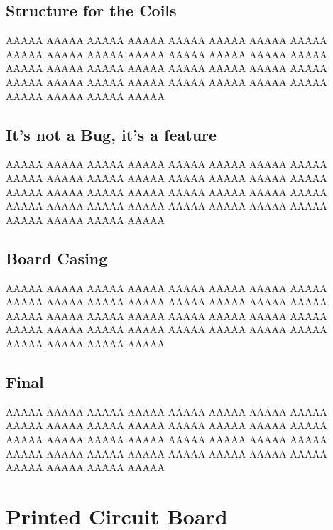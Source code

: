 \section{Structure for the Coils}

AAAAA AAAAA AAAAA AAAAA AAAAA AAAAA AAAAA AAAAA AAAAA AAAAA AAAAA AAAAA AAAAA AAAAA AAAAA AAAAA AAAAA AAAAA AAAAA AAAAA AAAAA AAAAA AAAAA AAAAA AAAAA AAAAA AAAAA AAAAA AAAAA AAAAA AAAAA AAAAA AAAAA AAAAA AAAAA AAAAA 

\section{It's not a Bug, it's a feature}

AAAAA AAAAA AAAAA AAAAA AAAAA AAAAA AAAAA AAAAA AAAAA AAAAA AAAAA AAAAA AAAAA AAAAA AAAAA AAAAA AAAAA AAAAA AAAAA AAAAA AAAAA AAAAA AAAAA AAAAA AAAAA AAAAA AAAAA AAAAA AAAAA AAAAA AAAAA AAAAA AAAAA AAAAA AAAAA AAAAA 

\section{Board Casing}

AAAAA AAAAA AAAAA AAAAA AAAAA AAAAA AAAAA AAAAA AAAAA AAAAA AAAAA AAAAA AAAAA AAAAA AAAAA AAAAA AAAAA AAAAA AAAAA AAAAA AAAAA AAAAA AAAAA AAAAA AAAAA AAAAA AAAAA AAAAA AAAAA AAAAA AAAAA AAAAA AAAAA AAAAA AAAAA AAAAA 

\section{Final}

AAAAA AAAAA AAAAA AAAAA AAAAA AAAAA AAAAA AAAAA AAAAA AAAAA AAAAA AAAAA AAAAA AAAAA AAAAA AAAAA AAAAA AAAAA AAAAA AAAAA AAAAA AAAAA AAAAA AAAAA AAAAA AAAAA AAAAA AAAAA AAAAA AAAAA AAAAA AAAAA AAAAA AAAAA AAAAA AAAAA 

\chapter{Printed Circuit Board}

